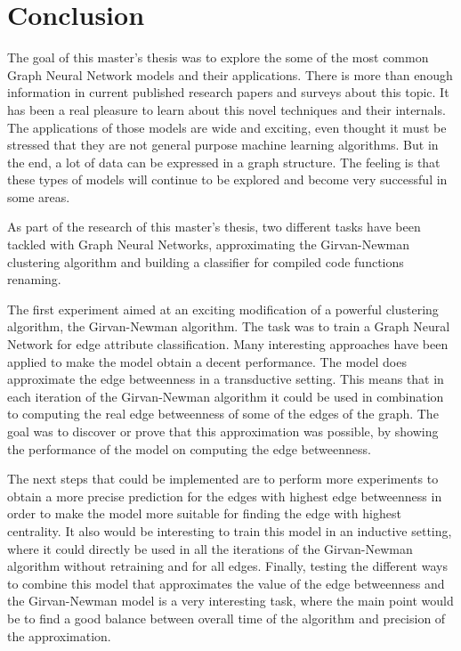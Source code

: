 \newpage
\section{Conclusion}


The goal of this master's thesis was to explore the some of the most common Graph Neural Network models and their applications. There is more than enough information in current published research papers and surveys about this topic. It has been a real pleasure to learn about this novel techniques and their internals. The applications of those models are wide and exciting, even thought it must be stressed that they are not general purpose machine learning algorithms. But in the end, a lot of data can be expressed in a graph structure. The feeling is that these types of models will continue to be explored and become very successful in some areas.


As part of the research of this master's thesis, two different tasks have been tackled with Graph Neural Networks, approximating the Girvan-Newman clustering algorithm and building a classifier for compiled code functions renaming.

The first experiment aimed at an exciting modification of a powerful clustering algorithm, the Girvan-Newman algorithm. The task was to train a Graph Neural Network for edge attribute classification. Many interesting approaches have been applied to make the model obtain a decent performance. The model does approximate the edge betweenness in a transductive setting. This means that in each iteration of the Girvan-Newman algorithm it could be used in combination to computing the real edge betweenness of some of the edges of the graph. The goal was to discover or prove that this approximation was possible, by showing the performance of the model on computing the edge betweenness.

The next steps that could be implemented are to perform more experiments to obtain a more precise prediction for the edges with highest edge betweenness in order to make the model more suitable for finding the edge with highest centrality. It also would be interesting to train this model in an inductive setting, where it could directly be used in all the iterations of the Girvan-Newman algorithm without retraining and for all edges. Finally, testing the different ways to combine this model that approximates the value of the edge betweenness and the Girvan-Newman model is a very interesting task, where the main point would be to find a good balance between overall time of the algorithm and precision of the approximation.

